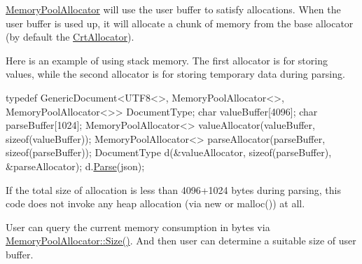 {\ttfamily \hyperlink{class_memory_pool_allocator}{Memory\+Pool\+Allocator}} will use the user buffer to satisfy allocations. When the user buffer is used up, it will allocate a chunk of memory from the base allocator (by default the {\ttfamily \hyperlink{class_crt_allocator}{Crt\+Allocator}}).

Here is an example of using stack memory. The first allocator is for storing values, while the second allocator is for storing temporary data during parsing.


\begin{DoxyCode}
\textcolor{keyword}{typedef} GenericDocument<UTF8<>, MemoryPoolAllocator<>, MemoryPoolAllocator<>> DocumentType;
\textcolor{keywordtype}{char} valueBuffer[4096];
\textcolor{keywordtype}{char} parseBuffer[1024];
MemoryPoolAllocator<> valueAllocator(valueBuffer, \textcolor{keyword}{sizeof}(valueBuffer));
MemoryPoolAllocator<> parseAllocator(parseBuffer, \textcolor{keyword}{sizeof}(parseBuffer));
DocumentType d(&valueAllocator, \textcolor{keyword}{sizeof}(parseBuffer), &parseAllocator);
d.\hyperlink{class_generic_document_aebd4e7fddd80c1e1174837aee6d2159b}{Parse}(json);
\end{DoxyCode}


If the total size of allocation is less than 4096+1024 bytes during parsing, this code does not invoke any heap allocation (via {\ttfamily new} or {\ttfamily malloc()}) at all.

User can query the current memory consumption in bytes via {\ttfamily \hyperlink{class_memory_pool_allocator_a2ccb6c068b8b35dbc3680dc5563af2f4}{Memory\+Pool\+Allocator\+::\+Size()}}. And then user can determine a suitable size of user buffer. 